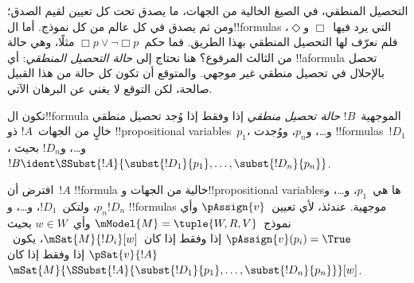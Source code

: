 \documentclass[../../../include/open-logic-section]{subfiles}
\begin{document}


\begin{explain}
التحصيل المنطقي، في الصيغ الخالية من الجهات، ما يصدق تحت كل تعيين
لقيم الصدق؛ ومن ثم يصدق في كل عالم من كل نموذج. أما ال!!{formula}s
التي يرد فيها~$\Box$ و$\Diamond$، فلم نعرّف لها التحصيل المنطقي
بهذا الطريق. فما حكم~$\Box p \lor \lnot \Box p$ مثلًا، وهي حالة
من الثالث المرفوع؟ هنا نحتاج إلى \emph{حالة التحصيل المنطقي}:
أي !!a{formula} تحصل بالإحلال في تحصيل منطقي غير موجهي.
والمتوقع أن تكون كل حالة من هذا القبيل صالحة، لكن التوقع لا يغني
عن البرهان الآتي.
\end{explain}

\begin{defn}
  تكون ال!!{formula} الموجهية~$!B$ \emph{حالة تحصيل منطقي} إذا وفقط
  إذا وُجد تحصيل منطقي خالٍ من الجهات~$!A$ ذو !!{propositional
    variable}s~$p_1$، و\dots، و$p_n$، ووُجدت !!{formula}s~$!D_1$،
  و\dots، و$!D_n$ بحيث
  $!B \ident \SSubst{!A}{\subst{!D_1}{p_1},
    \dots, \subst{!D_n}{p_n}}$.
\end{defn}

\begin{lem}
  افترض أن~$!A$ !!{formula} خالية من الجهات و!!{propositional
  variable}sها هي~$p_1$، و\dots، و$p_n$، ولتكن~$!D_1$، و\dots،
  و$!D_n$ !!{formula}s موجهية. عندئذ، لأي تعيين~$\pAssign{v}$ وأي
  نموذج~$\mModel{M} = \tuple{W, R, V}$ وأي~$w \in W$ بحيث
  $\pAssign{v}(p_i) = \True$ إذا وفقط إذا كان~$\mSat{M}{!D_i}[w]$،
  يكون~$\pSat{v}{!A}$ إذا وفقط إذا كان
  $\mSat{M}{\SSubst{!A}{\subst{!D_1}{p_1}, \dots,
      \subst{!D_n}{p_n}}}[w]$.
\end{lem}
\end{document}
